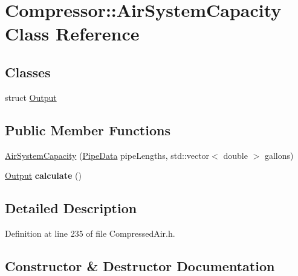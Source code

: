 \hypertarget{class_compressor_1_1_air_system_capacity}{}\section{Compressor\+:\+:Air\+System\+Capacity Class Reference}
\label{class_compressor_1_1_air_system_capacity}
\subsection*{Classes}
\begin{DoxyCompactItemize}
\item 
struct \hyperlink{struct_compressor_1_1_air_system_capacity_1_1_output}{Output}
\end{DoxyCompactItemize}
\subsection*{Public Member Functions}
\begin{DoxyCompactItemize}
\item 
\hyperlink{class_compressor_1_1_air_system_capacity_a270fa85146172b46703970a1bc8fe724}{Air\+System\+Capacity} (\hyperlink{struct_compressor_1_1_pipe_data}{Pipe\+Data} pipe\+Lengths, std\+::vector$<$ double $>$ gallons)
\item 
\mbox{\label{class_compressor_1_1_air_system_capacity_aed64b8bb2bfe66e7e8c9df69f5ad3f7e}} 
\hyperlink{struct_compressor_1_1_air_system_capacity_1_1_output}{Output} {\bfseries calculate} ()
\end{DoxyCompactItemize}


\subsection{Detailed Description}


Definition at line 235 of file Compressed\+Air.\+h.



\subsection{Constructor \& Destructor Documentation}
\mbox{\label{class_compressor_1_1_air_system_capacity_a270fa85146172b46703970a1bc8fe724}} 
